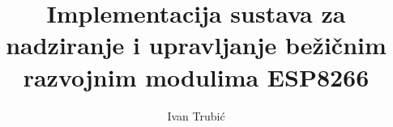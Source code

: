 \documentclass[times, utf8, zavrsni]{fer}
\begin{document}

\title{Implementacija sustava za nadziranje i upravljanje bežičnim razvojnim modulima ESP8266}

\author{Ivan Trubić}

\maketitle

\izvornik

\zahvala{}

\tableofcontents

\end{document}
